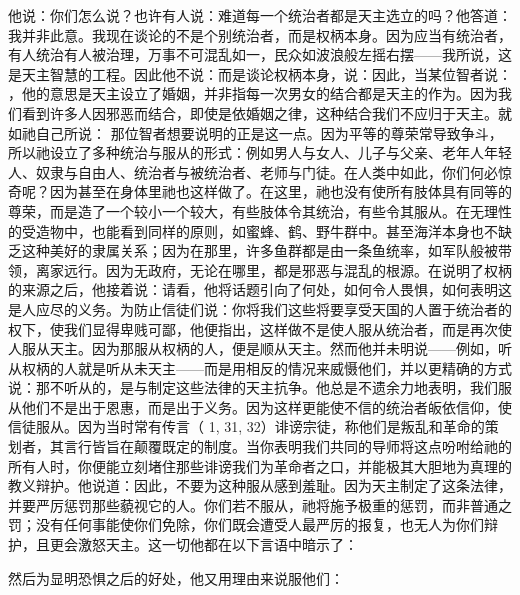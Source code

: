 他说：你们怎么说？也许有人说：难道每一个统治者都是天主选立的吗？他答道：我并非此意。我现在谈论的不是个别统治者，而是权柄本身。因为应当有统治者，有人统治有人被治理，万事不可混乱如一，民众如波浪般左摇右摆——我所说，这是天主智慧的工程。因此他不说：而是谈论权柄本身，说：因此，当某位智者说： ，他的意思是天主设立了婚姻，并非指每一次男女的结合都是天主的作为。因为我们看到许多人因邪恶而结合，即使是依婚姻之律，这种结合我们不应归于天主。就如祂自己所说： 那位智者想要说明的正是这一点。因为平等的尊荣常导致争斗，所以祂设立了多种统治与服从的形式：例如男人与女人、儿子与父亲、老年人年轻人、奴隶与自由人、统治者与被统治者、老师与门徒。在人类中如此，你们何必惊奇呢？因为甚至在身体里祂也这样做了。在这里，祂也没有使所有肢体具有同等的尊荣，而是造了一个较小一个较大，有些肢体令其统治，有些令其服从。在无理性的受造物中，也能看到同样的原则，如蜜蜂、鹤、野牛群中。甚至海洋本身也不缺乏这种美好的隶属关系；因为在那里，许多鱼群都是由一条鱼统率，如军队般被带领，离家远行。因为无政府，无论在哪里，都是邪恶与混乱的根源。在说明了权柄的来源之后，他接着说：请看，他将话题引向了何处，如何令人畏惧，如何表明这是人应尽的义务。为防止信徒们说：你将我们这些将要享受天国的人置于统治者的权下，使我们显得卑贱可鄙，他便指出，这样做不是使人服从统治者，而是再次使人服从天主。因为那服从权柄的人，便是顺从天主。然而他并未明说——例如，听从权柄的人就是听从未天主——而是用相反的情况来威慑他们，并以更精确的方式说：那不听从的，是与制定这些法律的天主抗争。他总是不遗余力地表明，我们服从他们不是出于恩惠，而是出于义务。因为这样更能使不信的统治者皈依信仰，使信徒服从。因为当时常有传言（  1, 31, 32）诽谤宗徒，称他们是叛乱和革命的策划者，其言行皆旨在颠覆既定的制度。当你表明我们共同的导师将这点吩咐给祂的所有人时，你便能立刻堵住那些诽谤我们为革命者之口，并能极其大胆地为真理的教义辩护。他说道：因此，不要为这种服从感到羞耻。因为天主制定了这条法律，并要严厉惩罚那些藐视它的人。你们若不服从，祂将施予极重的惩罚，而非普通之罚；没有任何事能使你们免除，你们既会遭受人最严厉的报复，也无人为你们辩护，且更会激怒天主。这一切他都在以下言语中暗示了：\par

 然后为显明恐惧之后的好处，他又用理由来说服他们：\par

